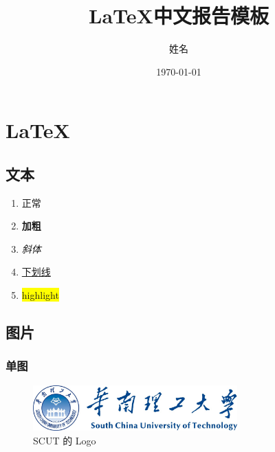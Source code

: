 \documentclass[UTF8]{ctexrep}
\title{\LaTeX 中文报告模板}
\author{姓名}
\date{\today}
\begin{document}
\pagestyle{plain}
\setcounter{page}{1}
\maketitle
{
    \hypersetup{linkcolor=black}
    \tableofcontents
    \newpage
}
\setcounter{page}{1}
\pagestyle{headings}

\chapter{\LaTeX}
\label{chapter:example}

\section{文本}

\begin{enumerate}
    \item 正常
    \item \textbf{加粗}
    \item \textit{斜体}
    \item \underline{下划线}
    \item \colorbox{yellow}{highlight}
\end{enumerate}

\section{图片}

\subsection{单图}

\begin{figure}[H]
    \centering
    \includegraphics[width=0.7\textwidth]{./img/logo.png}
    \caption{SCUT 的 Logo}
    \label{fig:logo}
\end{figure}
\end{document}
